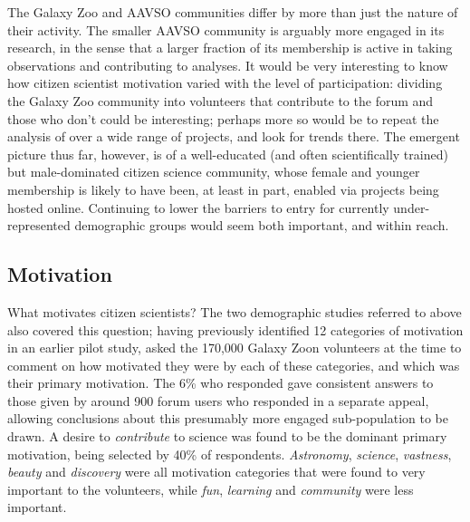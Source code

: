 \documentclass{ar2e}
\begin{document}
The Galaxy Zoo and AAVSO communities differ by more than just the nature of
their activity. The smaller AAVSO community is arguably more engaged in its
research, in the sense that a larger fraction of its membership is active in
taking observations and contributing to analyses. It would be very interesting
to know how citizen scientist motivation varied with the level of
participation: dividing the Galaxy Zoo community into volunteers that
contribute to the  forum and those who don't could be interesting; perhaps
more so would be to repeat the analysis of \citeauthor{Rad++2013} over a wide
range of projects, and look for trends there. The emergent picture thus far,
however, is of a well-educated (and often scientifically trained)  but
male-dominated citizen science community, whose female and younger membership
is likely to have been, at least in part, enabled via projects being hosted
online. Continuing to lower the barriers to entry for currently
under-represented demographic groups would seem both important, and within
reach.



\subsection{Motivation}
\label{sec:crowd:motivation}


What motivates citizen scientists? The two demographic studies referred to above
also covered this question; having previously \citep{Rad++2010} identified 12
categories of motivation in an earlier pilot study, \citet{Rad++2013} asked the
170,000 Galaxy Zoon volunteers at the time to comment on how motivated they were
by each of these categories, and which was their primary motivation. The 6\% who
responded gave consistent answers to those given by around 900 forum users who
responded in a separate appeal, allowing conclusions about this presumably more
engaged sub-population to be drawn. A desire to {\it contribute} to science was
found to be the dominant primary motivation, being selected by 40\% of
respondents. {\it Astronomy}, {\it science}, {\it vastness}, {\it beauty} and 
{\it discovery} were all motivation categories that were found to very important
to the volunteers, while {\it fun}, {\it learning} and {\it community} were less
important. 
\end{document}
